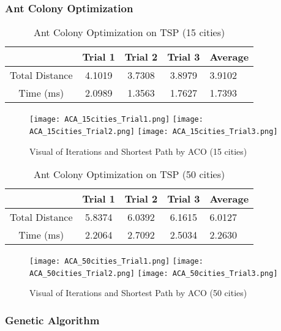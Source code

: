 \documentclass{article}
\begin{document}
\subsubsection{Ant Colony Optimization}
\begin{table}[H]
\centering
\begin{tabular}{|c|c|c|c|l|}
\hline
\textit{}      & Trial 1 & Trial 2 & Trial 3 & Average \\ \hline
Total Distance & 4.1019  & 3.7308  & 3.8979  & 3.9102  \\ \hline
Time (ms)      & 2.0989  & 1.3563  & 1.7627  & 1.7393  \\ \hline
\end{tabular}
\caption{Ant Colony Optimization on TSP (15 cities)}
\label{tab:my-table}
\end{table}

\begin{figure} [H]
    \centering
    \texttt{[image: ACA\_15cities\_Trial1.png]}\hfill
    \texttt{[image: ACA\_15cities\_Trial2.png]}\hfill
    \texttt{[image: ACA\_15cities\_Trial3.png]}
    \caption{Visual of Iterations and Shortest Path by ACO (15 cities)}
    \label{fig:my_label}
\end{figure}

\begin{table}[H]
\centering
\begin{tabular}{|c|c|c|c|l|}
\hline
\textit{}      & Trial 1 & Trial 2 & Trial 3 & Average \\ \hline
Total Distance & 5.8374  & 6.0392  & 6.1615  & 6.0127  \\ \hline
Time (ms)      & 2.2064  & 2.7092  & 2.5034  & 2.2630  \\ \hline
\end{tabular}
\caption{Ant Colony Optimization on TSP (50 cities)}
\label{tab:my-table}
\end{table}

\begin{figure} [H]
    \centering
    \texttt{[image: ACA\_50cities\_Trial1.png]}\hfill
    \texttt{[image: ACA\_50cities\_Trial2.png]}\hfill
    \texttt{[image: ACA\_50cities\_Trial3.png]}
    \caption{Visual of Iterations and Shortest Path by ACO (50 cities)}
    \label{fig:my_label}
\end{figure}

\subsubsection{Genetic Algorithm}
\end{document}
